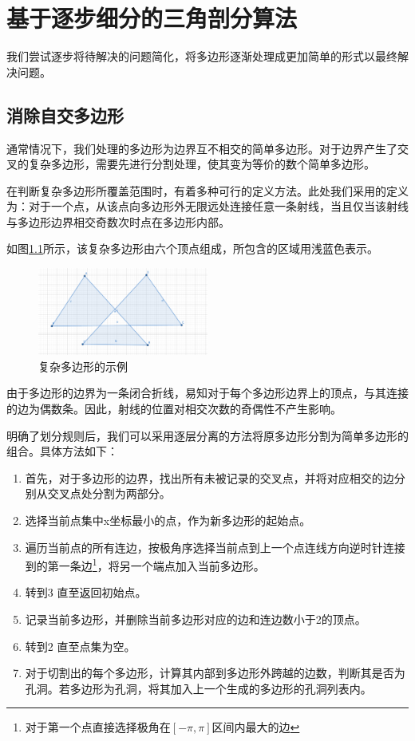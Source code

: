 \chapter{基于逐步细分的三角剖分算法}

我们尝试逐步将待解决的问题简化，将多边形逐渐处理成更加简单的形式以最终解决问题。
\section{消除自交多边形}
通常情况下，我们处理的多边形为边界互不相交的简单多边形。对于边界产生了交叉的复杂多边形，需要先进行分割处理，使其变为等价的数个简单多边形。

在判断复杂多边形所覆盖范围时，有着多种可行的定义方法。此处我们采用的定义为：对于一个点，从该点向多边形外无限远处连接任意一条射线，当且仅当该射线与多边形边界相交奇数次时点在多边形内部。

如图\ref*{complex}所示，该复杂多边形由六个顶点组成，所包含的区域用浅蓝色表示。

\begin{figure}[htp]
    \centering
    \includegraphics[width=0.5\textwidth]
    {figures/complex.png}
    \caption{复杂多边形的示例}
    \label{complex}
  \end{figure}

由于多边形的边界为一条闭合折线，易知对于每个多边形边界上的顶点，与其连接的边为偶数条。因此，射线的位置对相交次数的奇偶性不产生影响。

明确了划分规则后，我们可以采用逐层分离的方法将原多边形分割为简单多边形的组合。具体方法如下：

\begin{enumerate}
    \item 首先，对于多边形的边界，找出所有未被记录的交叉点，并将对应相交的边分别从交叉点处分割为两部分。
    \item 选择当前点集中x坐标最小的点，作为新多边形的起始点。
    \item 遍历当前点的所有连边，按极角序选择当前点到上一个点连线方向逆时针连接到的第一条边\footnote{对于第一个点直接选择极角在\([-\pi,\pi]\)区间内最大的边}，将另一个端点加入当前多边形。
    \item 转到3 直至返回初始点。
    \item 记录当前多边形，并删除当前多边形对应的边和连边数小于2的顶点。
    \item 转到2 直至点集为空。
    \item 对于切割出的每个多边形，计算其内部到多边形外跨越的边数，判断其是否为孔洞。若多边形为孔洞，将其加入上一个生成的多边形的孔洞列表内。
\end{enumerate}


